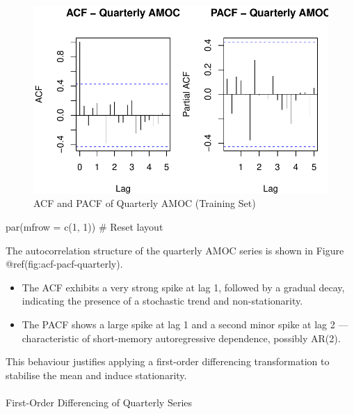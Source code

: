 \documentclass[
  11pt,
]{article}
\makeatletter
\let\oldparagraph\paragraph
\renewcommand{\paragraph}{
    \@ifstar
      \xxxParagraphStar
      \xxxParagraphNoStar
  }
\newcommand{\xxxParagraphStar}[1]{\oldparagraph*{#1}\mbox{}}
\newcommand{\xxxParagraphNoStar}[1]{\oldparagraph{#1}\mbox{}}
\newenvironment{Shaded}{\begin{snugshade}}{\end{snugshade}}
\newcommand{\AttributeTok}[1]{\textcolor[rgb]{0.40,0.45,0.13}{#1}}
\newcommand{\CommentTok}[1]{\textcolor[rgb]{0.37,0.37,0.37}{#1}}
\newcommand{\DecValTok}[1]{\textcolor[rgb]{0.68,0.00,0.00}{#1}}
\newcommand{\FunctionTok}[1]{\textcolor[rgb]{0.28,0.35,0.67}{#1}}
\newcommand{\NormalTok}[1]{\textcolor[rgb]{0.00,0.23,0.31}{#1}}
\makeatother
\begin{document}
\begin{figure}[H]

{\centering \includegraphics{project_files/figure-pdf/fig-acf-pacf-quarterly-1.pdf}

}

\caption{ACF and PACF of Quarterly AMOC (Training Set)}

\end{figure}%

\begin{Shaded}
\begin{Highlighting}[]
\FunctionTok{par}\NormalTok{(}\AttributeTok{mfrow =} \FunctionTok{c}\NormalTok{(}\DecValTok{1}\NormalTok{, }\DecValTok{1}\NormalTok{))  }\CommentTok{\# Reset layout}
\end{Highlighting}
\end{Shaded}

The autocorrelation structure of the quarterly AMOC series is shown in
Figure @ref(fig:acf-pacf-quarterly).

\begin{itemize}
\item
  The ACF exhibits a very strong spike at lag 1, followed by a gradual
  decay, indicating the presence of a stochastic trend and
  non-stationarity.
\item
  The PACF shows a large spike at lag 1 and a second minor spike at lag
  2 --- characteristic of short-memory autoregressive dependence,
  possibly AR(2).
\end{itemize}

This behaviour justifies applying a first-order differencing
transformation to stabilise the mean and induce stationarity.

\paragraph{First-Order Differencing of Quarterly
Series}\label{first-order-differencing-of-quarterly-series}
\end{document}
